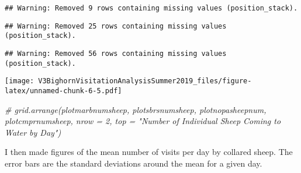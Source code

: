 \documentclass[]{article}
\newenvironment{Shaded}{\begin{snugshade}}{\end{snugshade}}
\newcommand{\CommentTok}[1]{\textcolor[rgb]{0.56,0.35,0.01}{\textit{#1}}}
\begin{document}
\begin{verbatim}
## Warning: Removed 9 rows containing missing values (position_stack).
\end{verbatim}

\begin{verbatim}
## Warning: Removed 25 rows containing missing values (position_stack).
\end{verbatim}

\begin{verbatim}
## Warning: Removed 56 rows containing missing values (position_stack).
\end{verbatim}

\texttt{[image: V3BighornVisitationAnalysisSummer2019\_files/figure-latex/unnamed-chunk-6-5.pdf]}

\begin{Shaded}
\begin{Highlighting}[]
\CommentTok{# grid.arrange(plotmarbnumsheep, plotsbrsnumsheep, plotnopasheepnum, plotcmprnumsheep, nrow = 2, top = "Number of Individual Sheep Coming to Water by Day")}
\end{Highlighting}
\end{Shaded}

I then made figures of the mean number of visits per day by collared
sheep. The error bars are the standard deviations around the mean for a
given day.
\end{document}
